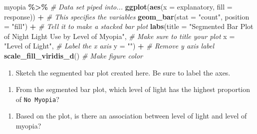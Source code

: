 \documentclass[
]{report}
\newenvironment{Shaded}{\begin{snugshade}}{\end{snugshade}}
\newcommand{\AttributeTok}[1]{\textcolor[rgb]{0.13,0.29,0.53}{#1}}
\newcommand{\CommentTok}[1]{\textcolor[rgb]{0.56,0.35,0.01}{\textit{#1}}}
\newcommand{\FunctionTok}[1]{\textcolor[rgb]{0.13,0.29,0.53}{\textbf{#1}}}
\newcommand{\NormalTok}[1]{#1}
\newcommand{\SpecialCharTok}[1]{\textcolor[rgb]{0.81,0.36,0.00}{\textbf{#1}}}
\newcommand{\StringTok}[1]{\textcolor[rgb]{0.31,0.60,0.02}{#1}}
\providecommand{\tightlist}{%
  \setlength{\itemsep}{0pt}\setlength{\parskip}{0pt}}
\begin{document}
\begin{Shaded}
\begin{Highlighting}[]
\NormalTok{myopia }\SpecialCharTok{\%\textgreater{}\%} \CommentTok{\# Data set piped into...}
\FunctionTok{ggplot}\NormalTok{(}\FunctionTok{aes}\NormalTok{(}\AttributeTok{x =}\NormalTok{ explanatory, }\AttributeTok{fill =}\NormalTok{ response)) }\SpecialCharTok{+}   \CommentTok{\# This specifies the variables}
  \FunctionTok{geom\_bar}\NormalTok{(}\AttributeTok{stat =} \StringTok{"count"}\NormalTok{, }\AttributeTok{position =} \StringTok{"fill"}\NormalTok{) }\SpecialCharTok{+}  \CommentTok{\# Tell it to make a stacked bar plot}
  \FunctionTok{labs}\NormalTok{(}\AttributeTok{title =} \StringTok{"Segmented Bar Plot of Night Light Use by Level of Myopia"}\NormalTok{,  }
       \CommentTok{\# Make sure to title your plot }
       \AttributeTok{x =} \StringTok{"Level of Light"}\NormalTok{,   }\CommentTok{\# Label the x axis}
       \AttributeTok{y =} \StringTok{""}\NormalTok{)  }\SpecialCharTok{+} \CommentTok{\# Remove y axis label}
  \FunctionTok{scale\_fill\_viridis\_d}\NormalTok{()  }\CommentTok{\# Make figure color}
\end{Highlighting}
\end{Shaded}

\begin{enumerate}
\def\labelenumi{\arabic{enumi}.}
\setcounter{enumi}{8}
\tightlist
\item
  Sketch the segmented bar plot created here. Be sure to label the axes.
\end{enumerate}

\vspace{2in}

\begin{enumerate}
\def\labelenumi{\arabic{enumi}.}
\setcounter{enumi}{9}
\tightlist
\item
  From the segmented bar plot, which level of light has the highest proportion of \texttt{No\ Myopia}?
\end{enumerate}

\vspace{0.5in}

\begin{enumerate}
\def\labelenumi{\arabic{enumi}.}
\setcounter{enumi}{10}
\tightlist
\item
  Based on the plot, is there an association between level of light and level of myopia?
\end{enumerate}

\vspace{1in}
\end{document}
